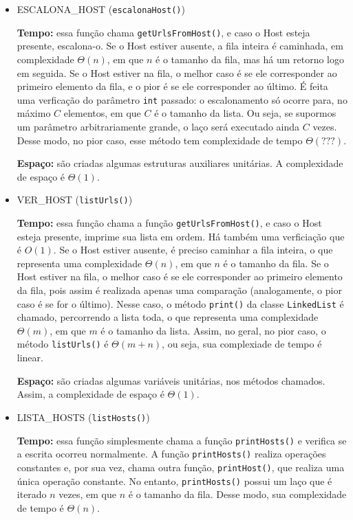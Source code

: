 \documentclass{article}
\def\code#1{\texttt{#1}}
\begin{document}
\begin{itemize}
    \item ESCALONA\_HOST (\code{escalonaHost()})

        \textbf{Tempo:} essa função chama \code{getUrlsFromHost()}, e caso o Host esteja presente, escalona-o. Se o Host estiver ausente, a fila inteira é caminhada, em complexidade \( \Theta(n) \), em que \( n \) é o tamanho da fila, mas há um retorno logo em seguida. Se o Host estiver na fila, o melhor caso é se ele corresponder ao primeiro elemento da fila, e o pior é se ele corresponder ao último. É feita uma verficação do parâmetro \code{int} passado: o escalonamento só ocorre para, no máximo \( C \) elementos, em que \( C \) é o tamanho da lista. Ou seja, se supormos um parâmetro arbitrariamente grande, o laço será executado ainda \( C \) vezes. Desse modo, no pior caso, esse método tem complexidade de tempo \( \Theta(???) \).

        \textbf{Espaço:} são criadas algumas estruturas auxiliares unitárias. A complexidade de espaço é \( \Theta(1) \).

    \item VER\_HOST (\code{listUrls()})

        \textbf{Tempo:} essa função chama a função \code{getUrlsFromHost()}, e caso o Host esteja presente, imprime sua lista em ordem. Há também uma verficiação que é \( O(1) \). Se o Host estiver ausente, é preciso caminhar a fila inteira, o que representa uma complexidade \( \Theta(n) \), em que \( n \) é o tamanho da fila. Se o Host estiver na fila, o melhor caso é se ele corresponder ao primeiro elemento da fila, pois assim é realizada apenas uma comparação (analogamente, o pior caso é se for o último). Nesse caso, o método \code{print()} da classe \code{LinkedList} é chamado, percorrendo a lista toda, o que representa uma complexidade \( \Theta(m) \), em que \( m \) é o tamanho da lista. Assim, no geral, no pior caso, o método \code{listUrls()} é \( \Theta(m + n) \), ou seja, sua complexiade de tempo é linear.

        \textbf{Espaço:} são criadas algumas variáveis unitárias, nos métodos chamados. Assim, a complexidade de espaço é \( \Theta(1) \).

    \item LISTA\_HOSTS (\code{listHosts()})

        \textbf{Tempo:} essa função simplesmente chama a função \code{printHosts()} e verifica se a escrita ocorreu normalmente. A função \code{printHosts()} realiza operações constantes e, por sua vez, chama outra função, \code{printHost()}, que realiza uma única operação constante. No entanto, \code{printHosts()} possui um laço que é iterado \( n \) vezes, em que \( n \) é o tamanho da fila. Desse modo, sua complexidade de tempo é \( \Theta(n) \).


\end{itemize}
\end{document}

